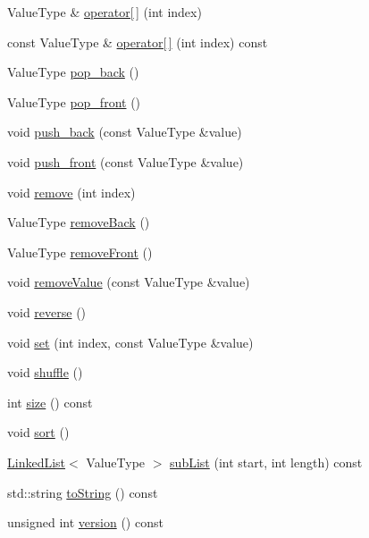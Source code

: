 \begin{DoxyCompactItemize}
\item 
Value\+Type \& \mbox{\hyperlink{classLinkedList_a7dbb3a92c8b6a08a04b564aed136b870}{operator\mbox{[}$\,$\mbox{]}}} (int index)
\item 
const Value\+Type \& \mbox{\hyperlink{classLinkedList_a1b5a4ea461655cbe512ab976aad8d809}{operator\mbox{[}$\,$\mbox{]}}} (int index) const
\item 
Value\+Type \mbox{\hyperlink{classLinkedList_ab48f65e37130b674bc0f6220cbb59491}{pop\+\_\+back}} ()
\item 
Value\+Type \mbox{\hyperlink{classLinkedList_aacdba74afa1be07d1046ece9e0512c77}{pop\+\_\+front}} ()
\item 
void \mbox{\hyperlink{classLinkedList_a8ff6f18ca45e769f2f8c7a0bcf79fad9}{push\+\_\+back}} (const Value\+Type \&value)
\item 
void \mbox{\hyperlink{classLinkedList_a9737dc314198d1cf306325134f000c5a}{push\+\_\+front}} (const Value\+Type \&value)
\item 
void \mbox{\hyperlink{classLinkedList_a2ad1aa316f278b2e9fa8121504749652}{remove}} (int index)
\item 
Value\+Type \mbox{\hyperlink{classLinkedList_af7878e9c2f67e06cbae525e9fa77e38e}{remove\+Back}} ()
\item 
Value\+Type \mbox{\hyperlink{classLinkedList_a02453aa96e93c38ca4c1d176307c8a63}{remove\+Front}} ()
\item 
void \mbox{\hyperlink{classLinkedList_a10e8154a489093d2b1f20596342bcd78}{remove\+Value}} (const Value\+Type \&value)
\item 
void \mbox{\hyperlink{classLinkedList_a310c0bebc002158f5646a91d60e4dc89}{reverse}} ()
\item 
void \mbox{\hyperlink{classLinkedList_a004ea6d6bc4a512ce4d52962727d5db2}{set}} (int index, const Value\+Type \&value)
\item 
void \mbox{\hyperlink{classLinkedList_a1905fe84eb39f020b32c58baf7a76758}{shuffle}} ()
\item 
int \mbox{\hyperlink{classLinkedList_af9593d4a5ff4274efaf429cb4f9e57cc}{size}} () const
\item 
void \mbox{\hyperlink{classLinkedList_a47fdc9eea42b6975cdc835bb2e08810e}{sort}} ()
\item 
\mbox{\hyperlink{classLinkedList}{Linked\+List}}$<$ Value\+Type $>$ \mbox{\hyperlink{classLinkedList_a1524b4e899bf6d7b9db87243f3be0c1b}{sub\+List}} (int start, int length) const
\item 
std\+::string \mbox{\hyperlink{classLinkedList_a1fe5121d6528fdea3f243321b3fa3a49}{to\+String}} () const
\item 
unsigned int \mbox{\hyperlink{classLinkedList_a0aa696ccb72cbf928535d6b646bac1aa}{version}} () const
\end{DoxyCompactItemize}


